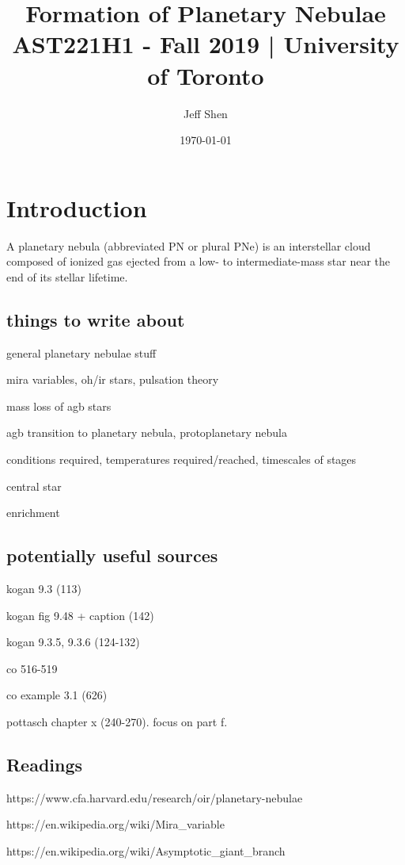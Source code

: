 \documentclass[a4paper,10pt, twocolumn]{article}
\begin{document}
\title{Formation of Planetary Nebulae\\
    \Large AST221H1 - Fall 2019 | University of Toronto}
\author{Jeff Shen}
\date{\today}
\maketitle

\section{Introduction}
A planetary nebula (abbreviated PN or plural PNe) is an interstellar cloud composed of ionized gas ejected from a low- to intermediate-mass star near the end of its stellar lifetime. 


\subsection{things to write about}
general planetary nebulae stuff

mira variables, oh/ir stars, pulsation theory 

mass loss of agb stars 

agb transition to planetary nebula, protoplanetary nebula

conditions required, temperatures required/reached, timescales of stages

central star 

enrichment 

\subsection{potentially useful sources}
kogan 9.3 (113)

kogan fig 9.48 + caption (142)

kogan 9.3.5, 9.3.6 (124-132)

co 516-519

co example 3.1 (626)

pottasch chapter x (240-270). focus on part f.

\subsection{Readings}

https://www.cfa.harvard.edu/research/oir/planetary-nebulae

https://en.wikipedia.org/wiki/Mira_variable

https://en.wikipedia.org/wiki/Asymptotic_giant_branch
\end{document}
